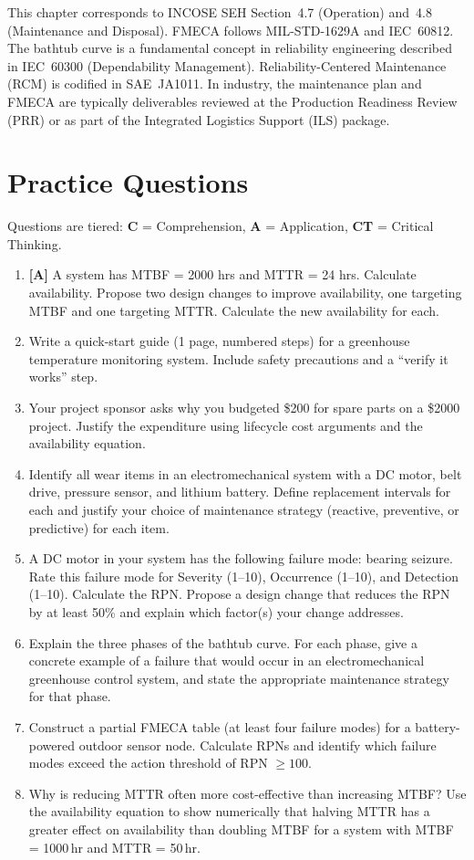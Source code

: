 \documentclass[11pt,letterpaper,twoside,openany]{book}
\begin{document}
\begin{tipbox}
This chapter corresponds to INCOSE SEH Section~4.7 (Operation) and~4.8 (Maintenance and Disposal). FMECA follows MIL-STD-1629A and IEC~60812. The bathtub curve is a fundamental concept in reliability engineering described in IEC~60300 (Dependability Management). Reliability-Centered Maintenance (RCM) is codified in SAE~JA1011. In industry, the maintenance plan and FMECA are typically deliverables reviewed at the Production Readiness Review (PRR) or as part of the Integrated Logistics Support (ILS) package.
\end{tipbox}

\FloatBarrier
\section{Practice Questions}
Questions are tiered: \textbf{C} = Comprehension, \textbf{A} = Application, \textbf{CT} = Critical Thinking.
\begin{enumerate}[leftmargin=1.5em]
\item \textbf{[A]} A system has MTBF = 2000 hrs and MTTR = 24 hrs. Calculate availability. Propose two design changes to improve availability, one targeting MTBF and one targeting MTTR. Calculate the new availability for each.
\item Write a quick-start guide (1 page, numbered steps) for a greenhouse temperature monitoring system. Include safety precautions and a ``verify it works'' step.
\item Your project sponsor asks why you budgeted \$200 for spare parts on a \$2000 project. Justify the expenditure using lifecycle cost arguments and the availability equation.
\item Identify all wear items in an electromechanical system with a DC motor, belt drive, pressure sensor, and lithium battery. Define replacement intervals for each and justify your choice of maintenance strategy (reactive, preventive, or predictive) for each item.
\item A DC motor in your system has the following failure mode: bearing seizure. Rate this failure mode for Severity (1--10), Occurrence (1--10), and Detection (1--10). Calculate the RPN. Propose a design change that reduces the RPN by at least 50\% and explain which factor(s) your change addresses.
\item Explain the three phases of the bathtub curve. For each phase, give a concrete example of a failure that would occur in an electromechanical greenhouse control system, and state the appropriate maintenance strategy for that phase.
\item Construct a partial FMECA table (at least four failure modes) for a battery-powered outdoor sensor node. Calculate RPNs and identify which failure modes exceed the action threshold of RPN $\geq 100$.
\item Why is reducing MTTR often more cost-effective than increasing MTBF? Use the availability equation to show numerically that halving MTTR has a greater effect on availability than doubling MTBF for a system with MTBF = 1000\,hr and MTTR = 50\,hr.
\end{enumerate}
\end{document}
